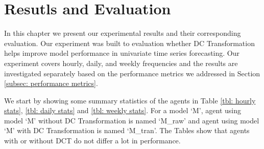 \chapter{Resutls and Evaluation}\label{ch: results and eval}
In this chapter we present our experimental results and their corresponding evaluation. Our experiment was built to evaluation whether DC Transformation helps improve model performance in univariate time series forecasting. Our experiment covers hourly, daily, and weekly frequencies and the results are investigated separately based on the performance metrics we addressed in Section \ref{subsec: performance metrics}.

We start by showing some summary statistics of the agents in Table \ref{tbl: hourly stats}, \ref{tbl: daily stats} and \ref{tbl: weekly stats}. For a model `M', agent using model `M' without DC Transformation is named `M\_raw' and agent using model `M' with DC Transformation is named `M\_tran'. The Tables show that agents with or without DCT do not differ a lot in performance.


